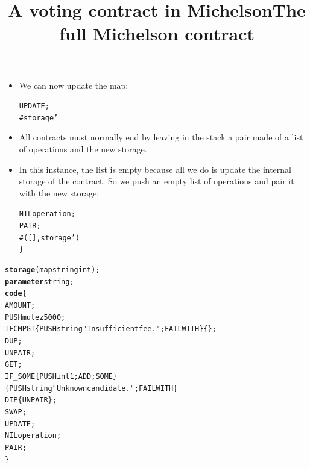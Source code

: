 \documentclass[wide]{slides}
\begin{document}
\begin{slide}
  \title{A voting contract in Michelson}

  \begin{itemize}

    \item We can now update the map:
      \begin{alltt}
          UPDATE;
          # storage'
      \end{alltt}

    \item All contracts must normally end by leaving in the stack a
      pair made of a list of operations and the new storage.

    \item In this instance, the list is empty because all we do is
      update the internal storage of the contract. So we push an empty
      list of operations and pair it with the new storage:
      \begin{alltt}
          NIL operation;
          PAIR;
          # ([], storage')
        \}
      \end{alltt}

  \end{itemize}

\end{slide}

\begin{slide}
  \title{The full Michelson contract}
  \begin{alltt}
\textbf{storage} (map string int);
\textbf{parameter} string;
\textbf{code} \{
  AMOUNT;
  PUSH mutez 5000;
  IFCMPGT \{ PUSH string "Insufficient fee."; FAILWITH \} \{\};
  DUP;
  UNPAIR;
  GET;
  IF\_SOME \{ PUSH int 1; ADD; SOME \}
            \{ PUSH string "Unknown candidate."; FAILWITH \}
  DIP \{ UNPAIR \};
  SWAP;
  UPDATE;
  NIL operation;
  PAIR;
\}
  \end{alltt}

\end{slide}
\end{document}
